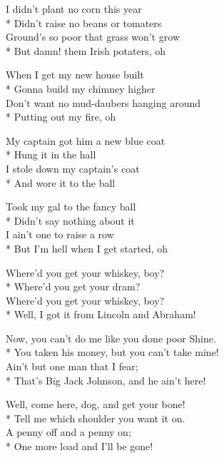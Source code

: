 


\versemark
I didn’t plant no corn this year\\*
Didn’t raise no beans or tomaters\\
Ground’s so poor that grass won’t grow\\*
But damn! them Irish potaters, oh

\versemark
When I get my new house built\\*
Gonna build my chimney higher\\
Don’t want no mud-daubers hanging around\\*
Putting out my fire, oh

\versemark
My captain got him a new blue coat\\*
Hung it in the hall\\
I stole down my captain’s coat\\*
And wore it to the ball

\versemark
Took my gal to the fancy ball\\*
Didn’t say nothing about it\\
I ain’t one to raise a row\\*
But I’m hell when I get started, oh

\versemark
Where’d you get your whiskey, boy?\\*
Where’d you get your dram?\\
Where’d you get your whiskey, boy?\\*
Well, I got it from Lincoln and Abraham!

\versemark
Now, you can’t do me like you done poor Shine.\\*
You taken his money, but you can’t take mine!\\
Ain’t but one man that I fear;\\*
That’s Big Jack Johnson, and he ain’t here!

\versemark
Well, come here, dog, and get your bone!\\*
Tell me which shoulder you want it on.\\
A penny off and a penny on;\\*
One more load and I’ll be gone!


